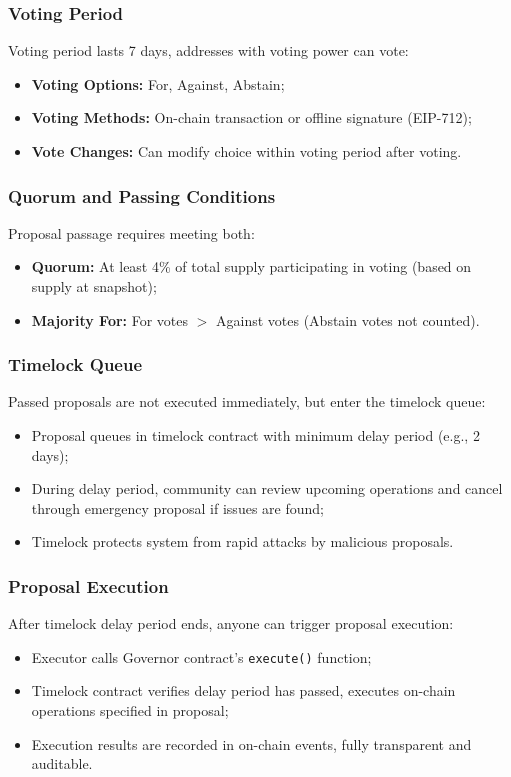 \documentclass{article}
\begin{document}
\subsubsection{Voting Period}
Voting period lasts 7 days, addresses with voting power can vote:
\begin{itemize}
  \item \textbf{Voting Options:} For, Against, Abstain;
  \item \textbf{Voting Methods:} On-chain transaction or offline signature (EIP-712);
  \item \textbf{Vote Changes:} Can modify choice within voting period after voting.
\end{itemize}

\subsubsection{Quorum and Passing Conditions}
Proposal passage requires meeting both:
\begin{itemize}
  \item \textbf{Quorum:} At least 4\% of total supply participating in voting (based on supply at snapshot);
  \item \textbf{Majority For:} For votes $>$ Against votes (Abstain votes not counted).
\end{itemize}

\subsubsection{Timelock Queue}
Passed proposals are not executed immediately, but enter the timelock queue:
\begin{itemize}
  \item Proposal queues in timelock contract with minimum delay period (e.g., 2 days);
  \item During delay period, community can review upcoming operations and cancel through emergency proposal if issues are found;
  \item Timelock protects system from rapid attacks by malicious proposals.
\end{itemize}

\subsubsection{Proposal Execution}
After timelock delay period ends, anyone can trigger proposal execution:
\begin{itemize}
  \item Executor calls Governor contract's \texttt{execute()} function;
  \item Timelock contract verifies delay period has passed, executes on-chain operations specified in proposal;
  \item Execution results are recorded in on-chain events, fully transparent and auditable.
\end{itemize}
\end{document}
